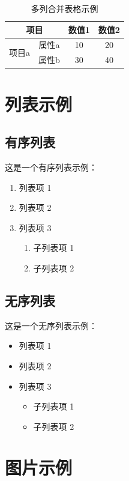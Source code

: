 \documentclass[]{ranreport} %
\begin{document}
\begin{table}[htbp]
    \centering
    \caption{多列合并表格示例}
    \begin{tabular}{|c|c|c|c|}
        \hline
        \multicolumn{2}{|c|}{项目} & 数值1 & 数值2      \\
        \hline
        \multirow{2}{*}{项目a}     & 属性a & 10    & 20 \\
        \cline{2-4}
                                   & 属性b & 30    & 40 \\
        \hline
    \end{tabular}
\end{table}

\section{列表示例}
\subsection{有序列表}
这是一个有序列表示例：
\begin{enumerate}
    \item 列表项 1
    \item 列表项 2
    \item 列表项 3
          \begin{enumerate}
              \item 子列表项 1
              \item 子列表项 2
          \end{enumerate}
\end{enumerate}

\subsection{无序列表}

这是一个无序列表示例：

\begin{itemize}
    \item 列表项 1
    \item 列表项 2
    \item 列表项 3
          \begin{itemize}
              \item 子列表项 1
              \item 子列表项 2
          \end{itemize}
\end{itemize}

\section{图片示例}
\end{document}
